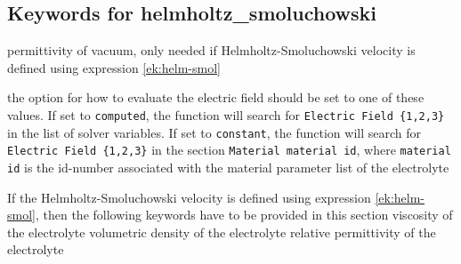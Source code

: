 \subsection*{Keywords for helmholtz\_smoluchowski}

\sifbegin

  \sifbegin
   permittivity of vacuum, only needed if Helmholtz-Smoluchowski velocity is defined using expression \eqref{ek:helm-smol}
  \sifend

  \sifbegin
    the option for how to evaluate the electric field should be set to one of these values.\newline
    If set to  \texttt{computed}, the function will search for \texttt{Electric Field \{1,2,3\}} in the list of solver variables. If set to \texttt{constant}, the function will search for \texttt{Electric Field \{1,2,3\}} in the section \texttt{Material material id}, where \texttt{material id} is the id-number associated with the material parameter list of the electrolyte
  \sifend

   \newline
  If the Helmholtz-Smoluchowski velocity is defined using expression \eqref{ek:helm-smol}, then the following keywords have to be provided in this section
  \sifbegin
   viscosity of the electrolyte
  volumetric density of the electrolyte
   relative permittivity of the electrolyte
  \sifend

